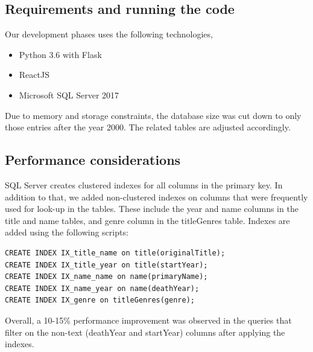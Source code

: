 \documentclass{sig-alternate}
\begin{document}
\subsection{Requirements and running the code}
Our development phases uses the following technologies,
\begin{itemize}
	\item Python 3.6 with Flask
	\item ReactJS 
	\item Microsoft SQL Server 2017
\end{itemize}
Due to memory and storage constraints, the database size was cut down to only those entries after the year 2000. The related tables are adjusted accordingly.
\subsection{Performance considerations}
	SQL Server creates clustered indexes for all columns in the primary key. In addition to that, we added non-clustered indexes on columns that were frequently used for look-up in the tables. These include the year and name columns in the title and name tables, and genre column in the titleGenres table. Indexes are added using the following scripts:
        \begin{lstlisting}
CREATE INDEX IX_title_name on title(originalTitle);
CREATE INDEX IX_title_year on title(startYear);
CREATE INDEX IX_name_name on name(primaryName);
CREATE INDEX IX_name_year on name(deathYear);
CREATE INDEX IX_genre on titleGenres(genre);
        \end{lstlisting}
        Overall, a 10-15\% performance improvement was observed in the queries that filter on the non-text (deathYear and startYear) columns after applying the indexes.
\end{document}
